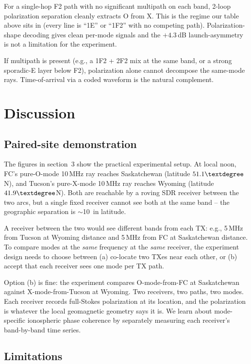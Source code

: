 \documentclass[11pt]{article}
\begin{document}
For a single-hop F2 path with no significant multipath on each band,
2-loop polarization separation cleanly extracts O from X.  This is
the regime our table above sits in (every line is ``1E'' or ``1F2''
with no competing path).  Polarization-shape decoding gives clean
per-mode signals and the $+4.3$\,dB launch-asymmetry is not a
limitation for the experiment.

If multipath is present (e.g., a 1F2 + 2F2 mix at the same band, or
a strong sporadic-E layer below F2), polarization alone cannot
decompose the same-mode rays.  Time-of-arrival via a coded waveform
is the natural complement.


\section{Discussion}

\subsection*{Paired-site demonstration}

The figures in section~3 show the practical experimental setup.  At
local noon, FC's pure-O-mode 10\,MHz ray reaches Saskatchewan
(latitude $51.1\textdegree$N), and Tucson's pure-X-mode 10\,MHz ray
reaches Wyoming (latitude $41.9\textdegree$N).  Both are reachable
by a roving SDR receiver between the two arcs, but a single fixed
receiver cannot see both at the same band -- the geographic
separation is $\sim$10\textdegree\ in latitude.

A receiver between the two would see different bands from each TX:
e.g., 5\,MHz from Tucson at Wyoming distance and 5\,MHz from FC at
Saskatchewan distance.  To compare modes at the \emph{same} frequency
at the \emph{same} receiver, the experiment design needs to choose
between (a) co-locate two TXes near each other, or (b) accept that
each receiver sees one mode per TX path.

Option (b) is fine: the experiment compares O-mode-from-FC at
Saskatchewan against X-mode-from-Tucson at Wyoming.  Two receivers,
two paths, two modes.  Each receiver records full-Stokes polarization
at its location, and the polarization is whatever the local
geomagnetic geometry says it is.  We learn about mode-specific
ionospheric phase coherence by separately measuring each receiver's
band-by-band time series.

\subsection*{Limitations}
\end{document}
